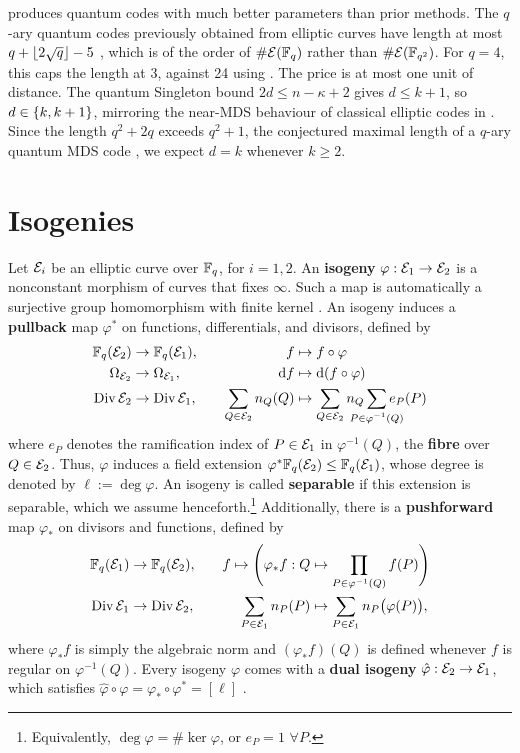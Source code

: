 \documentclass[twocolumn, 11pt]{scrartcl}
\begin{document}
{ produces quantum codes with much better parameters than prior methods. The $q$-ary quantum codes previously obtained from elliptic curves \cite{jin2012euclidean} have length at most $q+\floor{2\sqrt q}-5$ \cite[Rem.~3]{sok2021new}, which is of the order of $\#\mcE(\bbF_q)$ rather than $\#\mcE(\bbF_{q^2})$. For $q=4$, this caps the length at 3, against 24 using . The price is at most one unit of distance. The quantum Singleton bound $2d\leq n-\kappa+2$ gives $d\leq k+1$, so $d\in\set{k,k+1}$, mirroring the near-MDS behaviour of classical elliptic codes in . Since the length $q^2+2q$ exceeds $q^2+1$, the conjectured maximal length of a $q$-ary quantum MDS code \cite{sok2021new}, we expect $d=k$ whenever $k\geq2$.

} %

\section{Isogenies} \label{section:isogenies}

Let $\mcE_i$ be an elliptic curve over $\bbF_q$, for $i=1,2$. An \textbf{isogeny} $\varphi:\mcE_1\to\mcE_2$ is a nonconstant morphism of curves that fixes $\infty$. Such a map is automatically a surjective group homomorphism with finite kernel \cite[\S III.4]{silverman2009arithmetic}. An isogeny induces a \textbf{pullback} map $\varphi^*$ on functions, differentials, and divisors, defined by
\begin{alignat*}{2}
    \bbF_q(\mcE_2)&\to\bbF_q(\mcE_1), & \quad f &\mapsto f\circ\varphi \\
    \Omega_{\mcE_2}&\to\Omega_{\mcE_1}, & \quad \df &\mapsto \dx[(f\circ\varphi)] \\
    \Div\mcE_2&\to\Div\mcE_1, & \quad \sum_{Q\in\mcE_2} n_Q(Q) &\mapsto \sum_{Q\in\mcE_2} n_Q \sum_{\mathclap{P\in\varphi^{-1}(Q)}} e_P(P)
\end{alignat*}
where $e_P$ denotes the ramification index of $P\in\mcE_1$ in $\varphi^{-1}(Q)$, the \textbf{fibre} over $Q\in\mcE_2$. Thus, $\varphi$ induces a field extension $\varphi^*\bbF_q(\mcE_2)\leq\bbF_q(\mcE_1)$, whose degree is denoted by $\ell:=\deg\varphi$. An isogeny is called \textbf{separable} if this extension is separable, which we assume henceforth.\footnote{Equivalently, $\deg\varphi=\#\ker\varphi$, or $e_P=1$ $\forall P$.} Additionally, there is a \textbf{pushforward} map $\varphi_*$ on divisors and functions, defined by
\begin{alignat*}{2}
    \bbF_q(\mcE_1)&\to\bbF_q(\mcE_2), & \quad f \mapsto \pa[\Bigg]{\varphi_*f:Q&\mapsto\prod_{P\in\varphi^{-1}(Q)}f(P)} \\
    \Div\mcE_1&\to\Div\mcE_2, & \quad \sum_{P\in\mcE_1} n_P(P) &\mapsto \sum_{P\in\mcE_1} n_P\pa[\big]{\varphi(P)},
\end{alignat*}
where $\varphi_*f$ is simply the algebraic norm and $(\varphi_*f)(Q)$ is defined whenever $f$ is regular on $\varphi^{-1}(Q)$. Every isogeny $\varphi$ comes with a \textbf{dual isogeny} $\hat\varphi:\mcE_2\to\mcE_1$, which satisfies $\hat\varphi\circ\varphi=\varphi_*\circ\varphi^*=[\ell]$ \cite[\S III.6]{silverman2009arithmetic}.
\end{document}
